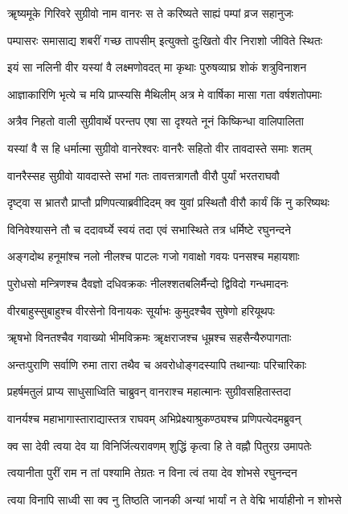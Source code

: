 \twolineshloka
{ॠष्यमूके गिरिवरे सुग्रीवो नाम वानरः}
{स ते करिष्यते साह्यं पम्पां व्रज सहानुजः}%

\twolineshloka
{पम्पासरः समासाद्य शबरीं गच्छ तापसीम्}
{इत्युक्तो दुःखितो वीर निराशो जीविते स्थितः}%

\twolineshloka
{इयं सा नलिनी वीर यस्यां वै लक्ष्मणोवदत्}
{मा कृथाः पुरुषव्याघ्र शोकं शत्रुविनाशन}%

\twolineshloka
{आज्ञाकारिणि भृत्ये च मयि प्राप्स्यसि मैथिलीम्}
{अत्र मे वार्षिका मासा गता वर्षशतोपमाः}%

\twolineshloka
{अत्रैव निहतो वाली सुग्रीवार्थे परन्तप}
{एषा सा दृश्यते नूनं किष्किन्धा वालिपालिता}%

\twolineshloka
{यस्यां वै स हि धर्मात्मा सुग्रीवो वानरेश्वरः}
{वानरैः सहितो वीर तावदास्ते समाः शतम्}%

\twolineshloka
{वानरैस्सह सुग्रीवो यावदास्ते सभां गतः}
{तावत्तत्रागतौ वीरौ पुर्यां भरतराघवौ}%

\twolineshloka
{दृष्ट्वा स भ्रातरौ प्राप्तौ प्रणिपत्याब्रवीदिदम्}
{क्व युवां प्रस्थितौ वीरौ कार्यं किं नु करिष्यथः}%

\twolineshloka
{विनिवेश्यासने तौ च ददावर्घ्ये स्वयं तदा}
{एवं सभास्थिते तत्र धर्मिष्टे रघुनन्दने}%

\twolineshloka
{अङ्गदोथ हनूमांश्च नलो नीलश्च पाटलः}
{गजो गवाक्षो गवयः पनसश्च महायशाः}%

\twolineshloka
{पुरोधसो मन्त्रिणश्च दैवज्ञो दधिवक्रकः}
{नीलश्शतबलिर्मैन्दो द्विविदो गन्धमादनः}%

\twolineshloka
{वीरबाहुस्सुबाहुश्च वीरसेनो विनायकः}
{सूर्याभः कुमुदश्चैव सुषेणो हरियूथपः}%

\twolineshloka
{ॠषभो विनतश्चैव गवाख्यो भीमविक्रमः}
{ॠक्षराजश्च धूम्रश्च सहसैन्यैरुपागताः}%

\twolineshloka
{अन्तःपुराणि सर्वाणि रुमा तारा तथैव च}
{अवरोधोङ्गदस्यापि तथान्याः परिचारिकाः}%

\twolineshloka
{प्रहर्षमतुलं प्राप्य साधुसाध्विति चाब्रुवन्}
{वानराश्च महात्मानः सुग्रीवसहितास्तदा}%

\twolineshloka
{वानर्यश्च महाभागास्ताराद्यास्तत्र राघवम्}
{अभिप्रेक्ष्याश्रुकण्ठ्यश्च प्रणिपत्येदमब्रुवन्}%

\twolineshloka
{क्व सा देवी त्वया देव या विनिर्जित्यरावणम्}
{शुद्धिं कृत्वा हि ते वह्नौ पितुरग्र उमापतेः}%

\twolineshloka
{त्वयानीता पुरीं राम न तां पश्यामि तेग्रतः}
{न विना त्वं तया देव शोभसे रघुनन्दन}%

\twolineshloka
{त्वया विनापि साध्वी सा क्व नु तिष्ठति जानकी}
{अन्यां भार्यां न ते वेद्मि भार्याहीनो न शोभसे}%

